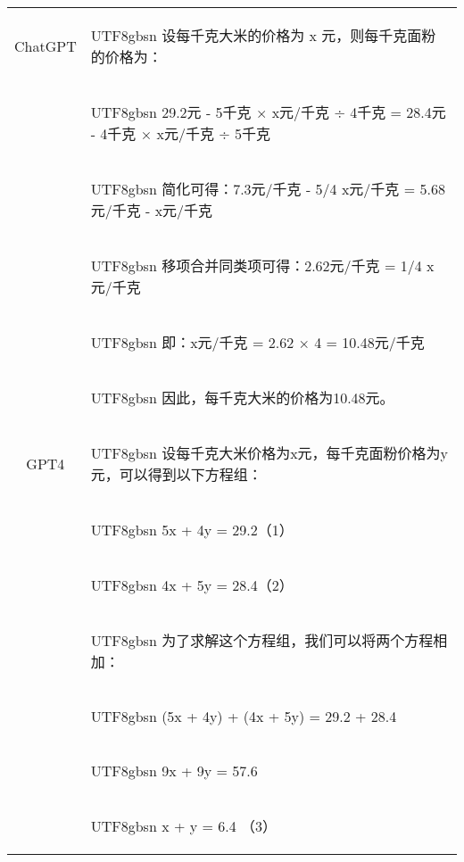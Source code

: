 \documentclass{article}
\begin{document}
\begin{table}[h!]
\begin{tabular}{ c|l }
  \hline
  ChatGPT & \begin{CJK*}{UTF8}{gbsn} 设每千克大米的价格为 x 元，则每千克面粉的价格为：\end{CJK*}\\
             & \begin{CJK*}{UTF8}{gbsn} 29.2元 - 5千克 × x元/千克 ÷ 4千克 = 28.4元 - 4千克 × x元/千克 ÷ 5千克 \end{CJK*}\\
             & \begin{CJK*}{UTF8}{gbsn} 简化可得：7.3元/千克 - 5/4 x元/千克 = 5.68元/千克 - x元/千克 \end{CJK*}\\
             & \begin{CJK*}{UTF8}{gbsn} 移项合并同类项可得：2.62元/千克 = 1/4 x元/千克 \end{CJK*}\\ 
             & \begin{CJK*}{UTF8}{gbsn} 即：x元/千克 = 2.62 × 4 = 10.48元/千克 \end{CJK*}\\ 
             & \begin{CJK*}{UTF8}{gbsn} 因此，每千克大米的价格为10.48元。 \end{CJK*}\\
 \hline
 GPT4 & \begin{CJK*}{UTF8}{gbsn} 设每千克大米价格为x元，每千克面粉价格为y元，可以得到以下方程组：\end{CJK*}\\
             & \begin{CJK*}{UTF8}{gbsn} 5x + 4y = 29.2（1）\end{CJK*}\\
             & \begin{CJK*}{UTF8}{gbsn} 4x + 5y = 28.4（2）\end{CJK*}\\
             & \begin{CJK*}{UTF8}{gbsn} 为了求解这个方程组，我们可以将两个方程相加：\end{CJK*}\\ 
             & \begin{CJK*}{UTF8}{gbsn} (5x + 4y) + (4x + 5y) = 29.2 + 28.4 \end{CJK*}\\
             & \begin{CJK*}{UTF8}{gbsn} 9x + 9y = 57.6 \end{CJK*}\\
             & \begin{CJK*}{UTF8}{gbsn}  x + y = 6.4 （3） \end{CJK*}\\

\end{tabular}
\end{table}
\end{document}
